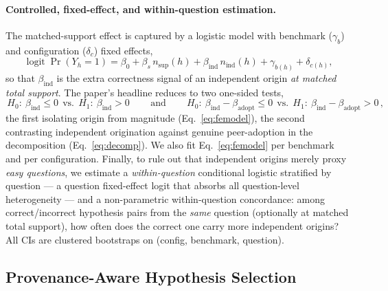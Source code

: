 \paragraph{Controlled, fixed-effect, and within-question estimation.}
\label{par:controlled_estimation}
The matched-support effect is captured by a logistic model with benchmark ($\gamma_b$) and configuration
($\delta_c$) fixed effects,
\begin{equation}
\operatorname{logit}\Pr(Y_h=1)=\beta_0+\beta_s\,n_{\mathrm{sup}}(h)+\beta_{\mathrm{ind}}\,n_{\mathrm{ind}}(h)+\gamma_{b(h)}+\delta_{c(h)} ,
\label{eq:femodel}
\end{equation}
so that $\beta_{\mathrm{ind}}$ is the extra correctness signal of an independent origin \emph{at matched
total support}. The paper's headline reduces to two one-sided tests,
\begin{equation}
\boxed{\,H_0\!:\ \beta_{\mathrm{ind}}\le 0\ \ \text{vs.}\ \ H_1\!:\ \beta_{\mathrm{ind}}>0\,}
\qquad\text{and}\qquad
\boxed{\,H_0\!:\ \beta_{\mathrm{ind}}-\beta_{\mathrm{adopt}}\le 0\ \ \text{vs.}\ \ H_1\!:\ \beta_{\mathrm{ind}}-\beta_{\mathrm{adopt}}>0\,},
\label{eq:h3tests}
\end{equation}
the first isolating origin from magnitude (Eq.~\ref{eq:femodel}), the second contrasting independent
origination against genuine peer-adoption in the decomposition (Eq.~\ref{eq:decomp}). We also fit
Eq.~\ref{eq:femodel} per benchmark and per configuration. Finally, to rule out that independent origins
merely proxy \emph{easy questions}, we estimate a \emph{within-question} conditional logistic stratified by
question --- a question fixed-effect logit that absorbs all question-level heterogeneity --- and a non-parametric
within-question concordance: among correct/incorrect hypothesis pairs from the \emph{same} question
(optionally at matched total support), how often does the correct one carry more independent origins? All
CIs are clustered bootstraps on (config, benchmark, question).

\subsection{Provenance-Aware Hypothesis Selection}
\label{subsec:provenance_selection}

